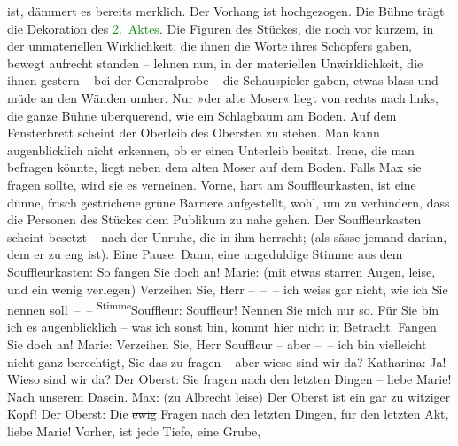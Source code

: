 \documentclass[twoside=false,titlepage=false,open=any, parskip=never, fontsize=12pt, headings=small, chapterprefix=false, appendixprefix=false]{scrbook}
\newcommand{\strikeout}[1]{\sout{#1}}
\newcommand{\Theight}{\dimexpr\fontcharht\font`W}
\newcommand{\pbposition}{\depth}
\newcommand{\pb}{\nobreak\hspace{0pt}\raisebox{-0.1em}{\raisebox{\pbposition}{\textnormal{|}}}\nobreak\hspace{0pt}}
\newcommand{\introOben}{\textnormal{\raisebox{\Theight}{\raisebox{-\height}{\small{v}\normalsize}}}}
\newcommand{\substVorne}{\textnormal{\raisebox{\Theight}{\raisebox{-\height}{\rotatebox[origin=c]{180}{v}\normalsize}}}}
\newcommand{\substDazwischen}{}
\newcommand{\substHinten}{\textnormal{\raisebox{\Theight}{\raisebox{-\height}{\small{v}\normalsize}}}}
\begin{document}
					ist, dämmert es bereits merklich. Der Vorhang ist hochgezogen. Die Bühne trägt
					die Dekoration des \textcolor{green}{2. Aktes}{}.
					Die Figuren des Stückes, die noch vor kurzem, in der unmateriellen Wirklichkeit,
					die ihnen die Worte ihres Schöpfers gaben, bewegt aufrecht standen – lehnen nun,
					in der materiellen Unwirklichkeit, die ihnen gestern – bei der Generalprobe –
					die Schauspieler gaben, etwas blass und müde an den Wänden umher. Nur »der alte
					Moser« liegt von rechts nach links, die ganze Bühne überquerend, wie ein
					Schlagbaum am Boden. Auf dem Fensterbrett scheint der Oberleib des Obersten zu
					stehen. Man kann augenblicklich nicht erkennen, ob er einen Unterleib besitzt.
					Irene, die man befragen könnte, liegt neben dem alten Moser auf dem Boden. Falls
					Max sie fragen sollte, wird sie es verneinen.\pend
           \pstart
           Vorne, hart am Souffleurkasten, ist eine dünne, frisch gestrichene grüne Barriere
					aufgestellt, wohl, um zu verhindern, dass die Person\introOben{}en\introOben{}
					des Stückes dem Publikum zu nahe gehen. Der Souffleurkasten scheint besetzt –
					nach der Unruhe, die in ihm herrscht; (als sässe jemand darinn, dem
					er zu eng ist).\pend
           \pstart
           Eine Pause.\pend
           \pstart
           Dann, eine ungeduldige Stimme aus dem Souffleurkasten:\pend
           \pstart
           {\pb}So fangen Sie doch an!\pend
           \pstart
           Marie: (mit etwas starren Augen, leise, und ein wenig verlegen) Verzeihen Sie,
					Herr – – – ich weiss gar nicht, wie ich Sie nennen soll – –\pend
           \pstart
           \substVorne{}\textsuperscript{Stimme}{\allowbreak}\substDazwischen{}Souffleur\substHinten{}: Souffleur! Nennen Sie mich nur so. Für Sie bin ich es augenblicklich –
					was ich sonst bin, kommt hier nicht in Betracht. Fangen Sie doch an!\pend
           \pstart
           Marie: Verzeihen Sie, Herr Souffleur – aber – – ich bin vielleicht nicht
					ganz berechtigt, Sie das zu fragen – aber wieso sind wir da?\pend
           \pstart
           Katharina: Ja! Wieso sind wir da?\pend
           \pstart
           Der Oberst: Sie fragen nach den letzten Dingen – liebe Marie! Nach unserem
					Dasein.\pend
           \pstart
           Max: (zu Albrecht leise) Der Oberst ist ein gar zu witziger Kopf!\pend
           \pstart
           Der Oberst: Die \strikeout{ewig} Fragen nach den letzten
					Dingen, für den letzten Akt, liebe Marie! Vorher, ist jede Tiefe, eine Grube,
\end{document}
